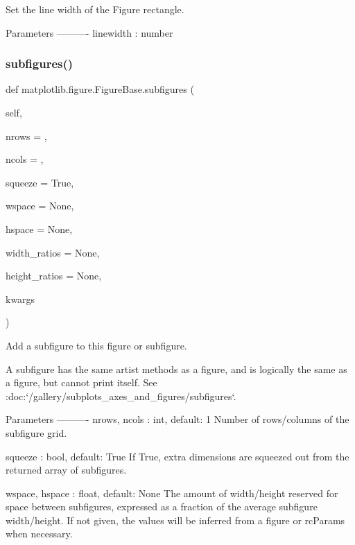 \begin{DoxyVerb}
\begin{DoxyVerb}
\begin{DoxyVerb}Set the line width of the Figure rectangle.

Parameters
----------
linewidth : number
\end{DoxyVerb}
 \mbox{\label{classmatplotlib_1_1figure_1_1FigureBase_abc0fc14d197f3350f8264f1f05db9b29}} 
\subsubsection{\texorpdfstring{subfigures()}{subfigures()}}
{\footnotesize\ttfamily def matplotlib.\+figure.\+Figure\+Base.\+subfigures (\begin{DoxyParamCaption}\item[{}]{self,  }\item[{}]{nrows = {},  }\item[{}]{ncols = {},  }\item[{}]{squeeze = {\ttfamily True},  }\item[{}]{wspace = {\ttfamily None},  }\item[{}]{hspace = {\ttfamily None},  }\item[{}]{width\+\_\+ratios = {\ttfamily None},  }\item[{}]{height\+\_\+ratios = {\ttfamily None},  }\item[{}]{kwargs }\end{DoxyParamCaption})}

\begin{DoxyVerb}Add a subfigure to this figure or subfigure.

A subfigure has the same artist methods as a figure, and is logically
the same as a figure, but cannot print itself.
See :doc:`/gallery/subplots_axes_and_figures/subfigures`.

Parameters
----------
nrows, ncols : int, default: 1
    Number of rows/columns of the subfigure grid.

squeeze : bool, default: True
    If True, extra dimensions are squeezed out from the returned
    array of subfigures.

wspace, hspace : float, default: None
    The amount of width/height reserved for space between subfigures,
    expressed as a fraction of the average subfigure width/height.
    If not given, the values will be inferred from a figure or
    rcParams when necessary.


\end{DoxyVerb}
\end{DoxyVerb}
\end{DoxyVerb}
